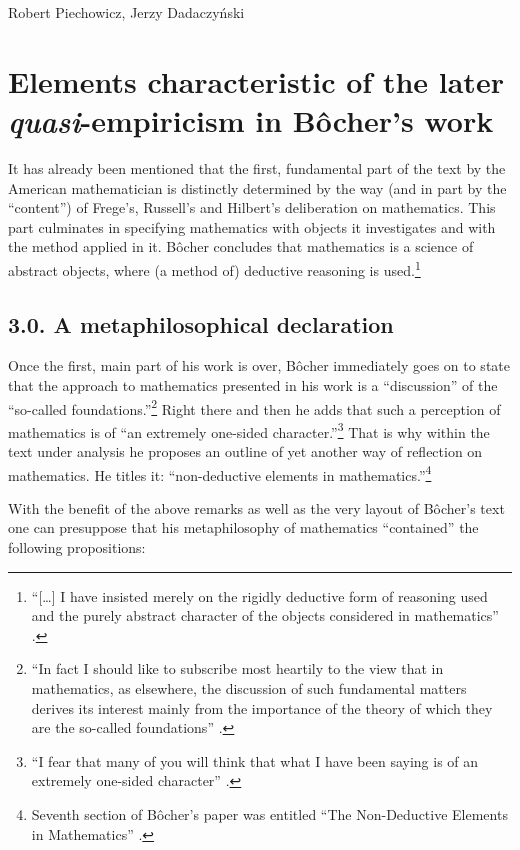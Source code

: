 \begin{artengenv}{Robert Piechowicz, Jerzy Dadaczyński}
\section{Elements characteristic of the later \textit{quasi}-empiricism in Bôcher's work}
It has already been mentioned that the first, fundamental part of the text by the American mathematician is distinctly determined by the way (and in part by the ``content'') of Frege's, Russell's and Hilbert's deliberation on mathematics. This part culminates in specifying mathematics with objects it investigates and with the method applied in it. Bôcher concludes that mathematics is a science of abstract objects, where (a method of) deductive reasoning is used.\footnote{``[…] I have insisted merely on the rigidly deductive form of reasoning used and the purely abstract character of the objects considered in mathematics''
\parencite[][p.132]{bocher_fundamental_1904}.%
}

\subsection{3.0. A metaphilosophical declaration}

Once the first, main part of his work is over, Bôcher immediately goes on to state that the approach to mathematics presented in his work is a ``discussion'' of the ``so-called foundations.''\footnote{``In fact I should like to subscribe most heartily to the view that in mathematics, as elsewhere, the discussion of such fundamental matters derives its interest mainly from the importance of the theory of which they are the so-called foundations''
\parencite[][pp.132–133]{bocher_fundamental_1904}.%
} Right there and then he adds that such a perception of mathematics is of ``an extremely one-sided character.''\footnote{``I fear that many of you will think that what I have been saying is of an extremely one-sided character'' 
\parencite[][p.132]{bocher_fundamental_1904}.%
} That is why within the text under analysis he proposes an outline of yet another way of reflection on mathematics. He titles it: ``non-deductive elements in mathematics.''\footnote{Seventh section of Bôcher's paper was entitled ``The Non-Deductive Elements in Mathematics'' 
\parencite[][p.132]{bocher_fundamental_1904}.%
}

With the benefit of the above remarks as well as the very layout of Bôcher's text one can presuppose that his metaphilosophy of mathematics ``contained'' the following propositions:


\end{artengenv}
